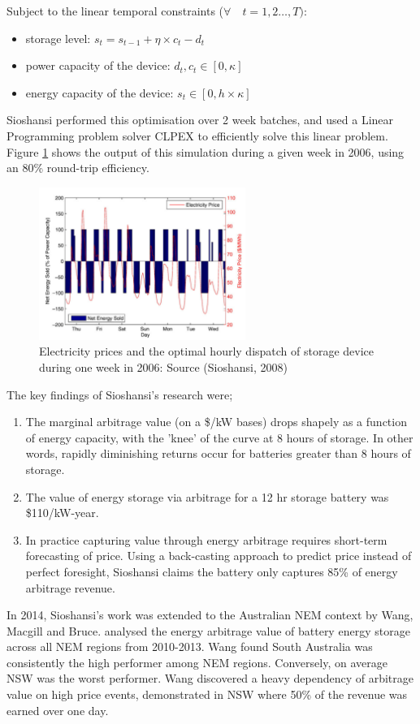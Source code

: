 Subject to the linear temporal constraints ($\forall \quad t = 1,2 \dots, T)$: 
\begin{itemize}
    \item storage level: $s_t = s_{t-1} + \eta \times c_t - d_t $
    \item power capacity of the device: $d_t, c_t \in [0, \kappa]$
    \item energy capacity of the device: $s_t \in [0, h \times \kappa]$
\end{itemize}
Sioshansi performed this optimisation over 2 week batches, and used a Linear Programming problem solver CLPEX to efficiently solve this linear problem. Figure \ref{fig:sioshansidispatch} shows the output of this simulation during a given week in 2006, using an 80\% round-trip efficiency.
\begin{figure}
    \begin{center}
        \includegraphics[width=0.6\textwidth]{Pictures/Chapter2/Sioshansi_output.png}
    \end{center}
    
    \caption{Electricity prices and the optimal hourly dispatch of storage device during one
week in 2006: Source (Sioshansi, 2008) }
    \label{fig:sioshansidispatch}
\end{figure}
The key findings of Sioshansi's research were;
\begin{enumerate}
    \item The marginal arbitrage value (on a \$/kW bases) drops shapely as a function of energy capacity, with the 'knee' of the curve at 8 hours of storage. In other words, rapidly diminishing returns occur for batteries greater than 8 hours of storage. 
    \item The value of energy storage via arbitrage for a 12 hr storage battery was \$110/kW-year.
    \item In practice capturing value through energy arbitrage requires short-term forecasting of price. Using a back-casting approach to predict price instead of perfect foresight, Sioshansi claims the battery only captures 85\% of energy arbitrage revenue. 
\end{enumerate}
In 2014, Sioshansi's work was extended to the Australian NEM context by Wang, Macgill and Bruce. \citep{Wang} analysed the energy arbitrage value of battery energy storage across all NEM regions from 2010-2013. Wang found South Australia was consistently the high performer among NEM regions. Conversely, on average NSW was the worst performer. Wang discovered a heavy dependency of arbitrage value on high price events, demonstrated in NSW where 50\% of the revenue was earned over one day. 

